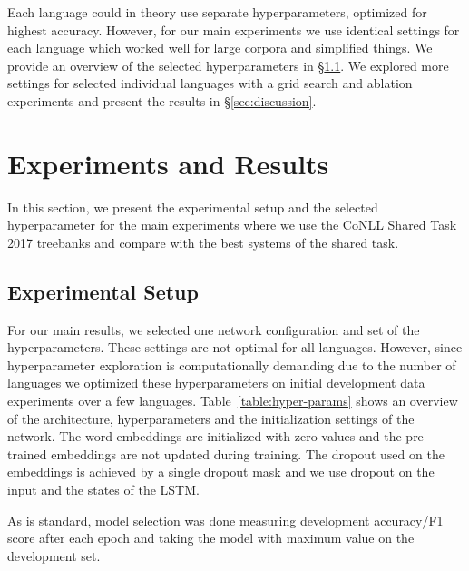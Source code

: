\documentclass[11pt,a4paper]{article}
\begin{document}
Each language could in theory use separate hyperparameters, optimized for highest accuracy. However, for our main experiments we use identical settings for each
language 
which worked well for large corpora and simplified things. We provide an overview of the selected hyperparameters in \S\ref{sec:hyperparameters}. We explored more settings for selected individual languages with a grid search and ablation experiments and present the results in \S\ref{sec:discussion}. 


\section{Experiments and Results}
\label{sec:experiments}

In this section, we present the experimental setup and the selected hyperparameter for the main experiments where we use the CoNLL Shared Task 2017 treebanks and compare with the best systems of the shared task.  

\subsection{Experimental Setup}
\label{sec:hyperparameters}

For our main results, we selected one network configuration and set of the hyperparameters. These settings are not optimal for all languages. However, since hyperparameter exploration is computationally demanding due to the number of languages we optimized these hyperparameters on initial development data experiments over a few languages. Table~\ref{table:hyper-params} shows an overview of the architecture, hyperparameters and the initialization settings of the network.
The word embeddings are initialized with zero values and the pre-trained embeddings are not updated during training. The dropout used on the embeddings is achieved by a single dropout mask and we use dropout on the input and the states of the LSTM.

As is standard, model selection was done measuring development accuracy/F1 score after each epoch and taking the model with maximum value on the development set.
\end{document}
